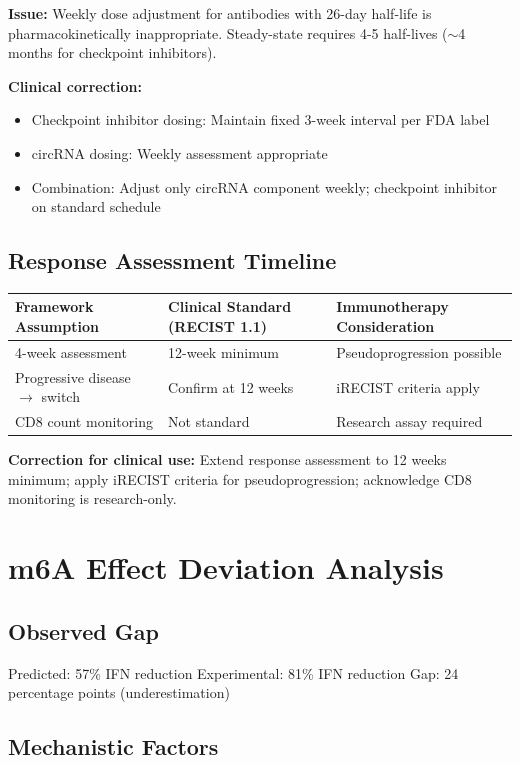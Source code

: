 \documentclass{article}
\begin{document}
\textbf{Issue:} Weekly dose adjustment for antibodies with 26-day half-life is pharmacokinetically inappropriate. Steady-state requires 4-5 half-lives ($\sim$4 months for checkpoint inhibitors).

\textbf{Clinical correction:}
\begin{itemize}
\item Checkpoint inhibitor dosing: Maintain fixed 3-week interval per FDA label
\item circRNA dosing: Weekly assessment appropriate
\item Combination: Adjust only circRNA component weekly; checkpoint inhibitor on standard schedule
\end{itemize}

\subsection{Response Assessment Timeline}

\begin{longtable}{lll}
\toprule
Framework Assumption & Clinical Standard (RECIST 1.1) & Immunotherapy Consideration \\
\midrule
4-week assessment & 12-week minimum & Pseudoprogression possible \\
Progressive disease $\rightarrow$ switch & Confirm at 12 weeks & iRECIST criteria apply \\
CD8 count monitoring & Not standard & Research assay required \\
\bottomrule
\end{longtable}

\textbf{Correction for clinical use:} Extend response assessment to 12 weeks minimum; apply iRECIST criteria for pseudoprogression; acknowledge CD8 monitoring is research-only.

\section{m6A Effect Deviation Analysis}

\subsection{Observed Gap}
Predicted: 57\% IFN reduction
Experimental: 81\% IFN reduction
Gap: 24 percentage points (underestimation)

\subsection{Mechanistic Factors}
\end{document}
